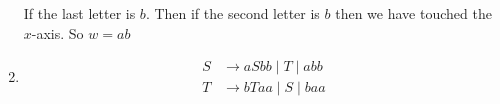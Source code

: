 \begin{enumerate}
  If the last letter is $b$. Then if the second letter is $b$ then we have touched the $x$-axis. So $w=ab$
  
  
  \item \begin{align*}
  	S &\to a S b b \mid T \mid  abb \\
  	T &\to b T a a\mid S\mid  baa
  \end{align*}
\end{enumerate}